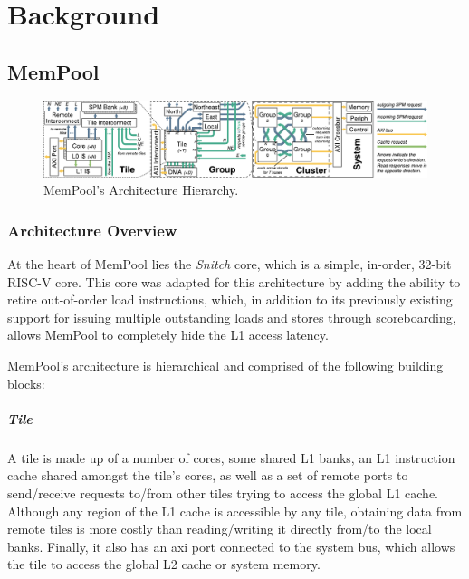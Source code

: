 \chapter{Background}
\label{ch:background}

\section{MemPool}
\label{sec:mempool}

\begin{figure}[t]
	\centering
	\includegraphics[width=\textwidth]{./fig/mempool.pdf}
	\caption{MemPool's Architecture Hierarchy.}%
	\label{fig:mempool}
\end{figure}

\subsection{Architecture Overview}
\label{subsec:mempool_architecture}

At the heart of MemPool lies the \emph{Snitch} core, which is a simple, in-order, 32-bit RISC-V
core. This core was adapted for this architecture by adding the ability to retire out-of-order load
instructions, which, in addition to its previously existing support for issuing multiple outstanding
loads and stores through scoreboarding, allows MemPool to completely hide the L1 access latency.

MemPool's architecture is hierarchical and comprised of the following building blocks:

\paragraph{Tile} A tile is made up of a number of cores, some shared L1 banks, an L1 instruction
cache shared amongst the tile's cores, as well as a set of remote ports to send/receive requests
to/from other tiles trying to access the global L1 cache. Although any region of the L1 cache is
accessible by any tile, obtaining data from remote tiles is more costly than reading/writing it
directly from/to the local banks. Finally, it also has an \gls{axi} port connected to the system
bus, which allows the tile to access the global L2 cache or system memory.

